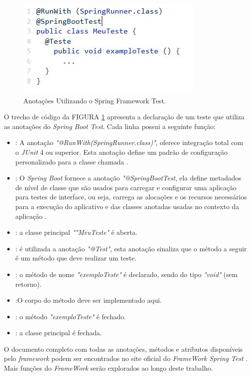 \begin{figure}[H]
	\centering
	\includegraphics[]{dados/figuras/testeSpring.JPG}
	\caption{Anotações Utilizando o Spring Framework Test.}
	\label{springfig2}
\end{figure}

O trecho de código da FIGURA \ref{springfig2} apresenta a declaração de um teste que utiliza as anotações do \textit{Spring Boot Test}. Cada linha possui a seguinte função:

\begin{itemize}

\item[1]: A anotação \textit{"@RunWith(SpringRunner.class)"}, oferece integração total com o \textit{JUnit} 4 ou superior. Esta anotação define um padrão de configuração personalizado para a classe chamada \cite{spring}. 

\item[2]: O \textit{Spring Boot} fornece a anotação \textit{"@SpringBootTest}, ela define metadados de nível de classe que são usados para carregar e configurar uma aplicação para testes de interface, ou seja,  carrega as alocações e os recursos necessários para a execução do aplicativo e das classes anotadas usadas no contexto da aplicação \cite{spring}.   

\item[3]: a classe principal \textit{""MeuTeste"} é aberta. 

\item[4]: é utilizada a anotação \textit{"@Test"}, esta anotação sinaliza que o método a seguir é um método que deve realizar um teste. 

\item[5]: o método de nome \textit{"exemploTeste"} é declarado, sendo do tipo \textit{"void"} (sem retorno). 

\item[6]:O corpo do método deve ser implementado aqui.

\item[7]: o método \textit{"exemploTeste"} é fechado.

\item[8]: a classe principal é fechada.

\end{itemize}

O documento completo com todas as anotações, métodos e atributos disponíveis pelo \textit{framework} podem ser encontrados no site oficial do \textit{FrameWork Spring Test} \cite{spring}. Mais funções do \textit{FrameWork} serão explorados ao longo deste trabalho.

